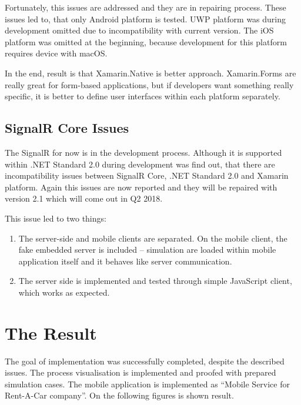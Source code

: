Fortunately, this issues are addressed and they are in repairing process. These issues led to, that only Android platform is tested. UWP platform was during development omitted due to incompatibility with current version. The iOS platform was omitted at the beginning, because development for this platform requires device with macOS. 

In the end, result is that Xamarin.Native is better approach. Xamarin.Forms are really great for form-based applications, but if developers want something really specific, it is better to define user interfaces within each platform separately. 
\subsection{SignalR Core Issues}
The SignalR for now is in the development process. Although it is supported within .NET Standard 2.0 during development was find out, that there are incompatibility issues between SignalR Core, .NET Standard 2.0 and Xamarin platform. Again this issues are now reported and they will be repaired with version 2.1 which will come out in Q2 2018.

This issue led to two things:
\begin{enumerate}
\item The server-side and mobile clients are separated. On the mobile client, the fake embedded server is included -- simulation are loaded within mobile application itself and it behaves like server communication. 
\item The server side is implemented and tested through simple JavaScript client, which works as expected. 
\end{enumerate}
\section{The Result}
The goal of implementation was successfully completed, despite the described issues. The process visualisation is implemented and proofed with prepared simulation cases. The mobile application is implemented as ``Mobile Service for Rent-A-Car  company''. On the following figures is shown result. 



